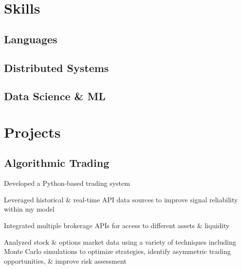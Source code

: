 \documentclass[]{resume}
\begin{document}
\begin{minipage}[t]{0.35\textwidth}
\begin{grayhighlight}
\sectionsep




\section{Skills}
\subsection{Languages}
\smallbreak
\subsection{Distributed Systems}

\smallbreak
\subsection{Data Science \& ML}


\sectionsep




\section{Projects}

\subsection{Algorithmic Trading}
\begin{tightemize}
\item Developed a Python-based trading system
\item Leveraged historical \& real-time API data sources to improve signal reliability within my model
\item Integrated multiple brokerage APIs for access to different assets \& liquidity
\item Analyzed stock \& options market data using a variety of techniques including Monte Carlo simulations to optimize strategies, identify asymmetric trading opportunities, \& improve risk assessment
\end{tightemize}


\end{grayhighlight}
\end{minipage}
\end{document}
